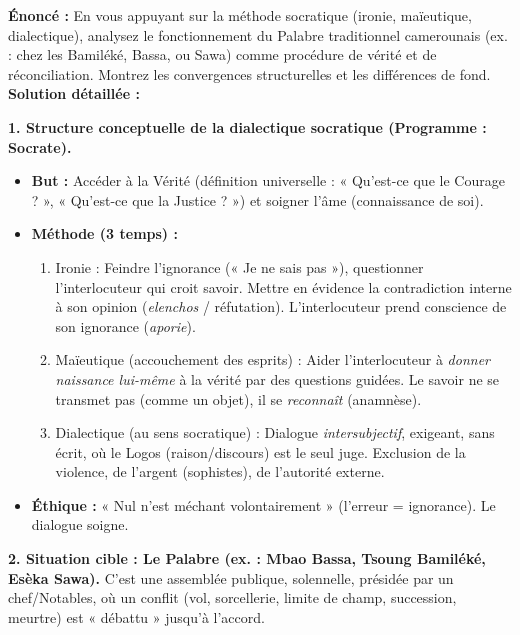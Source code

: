 \documentclass[11pt]{article}
\newcommand{\cle}[1]{{\popxbold\color{popdark}#1}}
\begin{document}
\begin{exoresolu}
\textbf{Énoncé :} En vous appuyant sur la méthode socratique (ironie, maïeutique, dialectique), analysez le fonctionnement du \cle{Palabre} traditionnel camerounais (ex. : chez les Bamiléké, Bassa, ou Sawa) comme procédure de vérité et de réconciliation. Montrez les convergences structurelles et les différences de fond.
\tcblower
\textbf{Solution détaillée :}

\textbf{1. Structure conceptuelle de la dialectique socratique (Programme : Socrate).}
\begin{itemize}
    \item \textbf{But :} Accéder à la \cle{Vérité} (définition universelle : « Qu'est-ce que le Courage ? », « Qu'est-ce que la Justice ? ») et soigner l'âme (connaissance de soi).
    \item \textbf{Méthode (3 temps) :}
        \begin{enumerate}
            \item \cle{Ironie} : Feindre l'ignorance (« Je ne sais pas »), questionner l'interlocuteur qui croit savoir. Mettre en évidence la \cle{contradiction} interne à son opinion (\emph{elenchos} / réfutation). L'interlocuteur prend conscience de son ignorance (\emph{aporie}).
            \item \cle{Maïeutique} (accouchement des esprits) : Aider l'interlocuteur à \emph{donner naissance lui-même} à la vérité par des questions guidées. Le savoir ne se transmet pas (comme un objet), il se \emph{reconnaît} (anamnèse).
            \item \cle{Dialectique} (au sens socratique) : Dialogue \emph{intersubjectif}, exigeant, sans écrit, où le \cle{Logos} (raison/discours) est le seul juge. Exclusion de la violence, de l'argent (sophistes), de l'autorité externe.
        \end{enumerate}
    \item \textbf{Éthique :} « Nul n'est méchant volontairement » (l'erreur = ignorance). Le dialogue soigne.
\end{itemize}

\textbf{2. Situation cible : Le Palabre (ex. : \cle{Mbao} Bassa, \cle{Tsoung} Bamiléké, \cle{Esèka} Sawa).}
C'est une assemblée publique, solennelle, présidée par un chef/Notables, où un conflit (vol, sorcellerie, limite de champ, succession, meurtre) est « débattu » jusqu'à l'accord.


\end{exoresolu}
\end{document}
